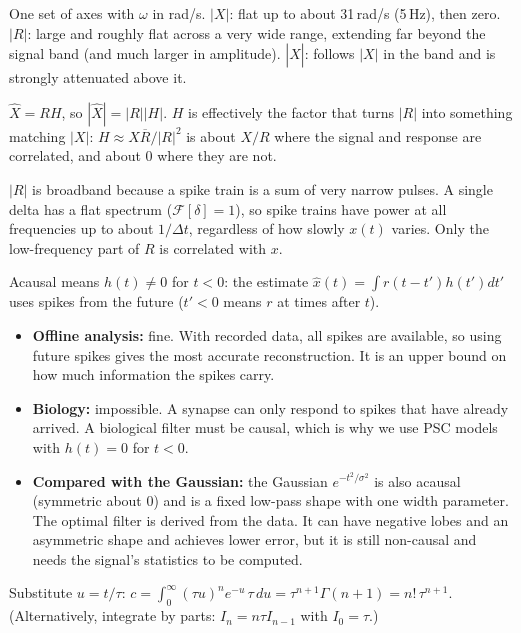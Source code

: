 \documentclass[10pt,letterpaper]{article}
\newcommand{\qsec}[1]{\vspace{8pt}{\large\bfseries #1}\par\vspace{2pt}}
\newcommand{\ans}[1]{\par\vspace{3pt}{\bfseries #1}\quad}
\begin{document}
\ans{4d.}
\begin{sketch}
One set of axes with $\omega$ in rad/s. $|X|$: flat up to about 31\,rad/s (5\,Hz), then zero. $|R|$: large and roughly flat across a very wide range, extending far beyond the signal band (and much larger in amplitude). $|\hat X|$: follows $|X|$ in the band and is strongly attenuated above it.
\end{sketch}
$\hat X = RH$, so $|\hat X| = |R||H|$. $H$ is effectively the factor that turns $|R|$ into something matching $|X|$: $H \approx X\overline R/|R|^2$ is about $X/R$ where the signal and response are correlated, and about 0 where they are not.

$|R|$ is broadband because a spike train is a sum of very narrow pulses. A single delta has a flat spectrum ($\mathcal F[\delta] = 1$), so spike trains have power at all frequencies up to about $1/\Delta t$, regardless of how slowly $x(t)$ varies. Only the low-frequency part of $R$ is correlated with $x$.

\ans{4e.}
Acausal means $h(t) \ne 0$ for $t < 0$: the estimate $\hat x(t) = \int r(t - t')h(t')dt'$ uses spikes from the future ($t' < 0$ means $r$ at times after $t$).
\begin{itemize}[leftmargin=1.5em,itemsep=1pt]
\item \textbf{Offline analysis:} fine. With recorded data, all spikes are available, so using future spikes gives the most accurate reconstruction. It is an upper bound on how much information the spikes carry.
\item \textbf{Biology:} impossible. A synapse can only respond to spikes that have already arrived. A biological filter must be causal, which is why we use PSC models with $h(t) = 0$ for $t < 0$.
\item \textbf{Compared with the Gaussian:} the Gaussian $e^{-t^2/\sigma^2}$ is also acausal (symmetric about 0) and is a fixed low-pass shape with one width parameter. The optimal filter is derived from the data. It can have negative lobes and an asymmetric shape and achieves lower error, but it is still non-causal and needs the signal's statistics to be computed.
\end{itemize}

\qsec{5. Post-synaptic current filters}

\ans{5a.}
Substitute $u = t/\tau$: $c = \int_0^\infty (\tau u)^n e^{-u}\,\tau\,du = \tau^{n+1}\Gamma(n+1) = n!\,\tau^{n+1}$. (Alternatively, integrate by parts: $I_n = n\tau I_{n-1}$ with $I_0 = \tau$.)
\end{document}
